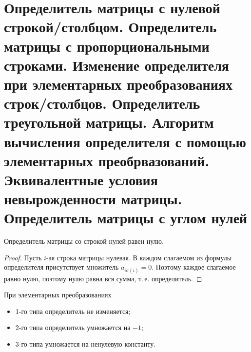 \section{Определитель матрицы с нулевой строкой/столбцом. Определитель матрицы с пропорциональными строками. Изменение определителя при элементарных преобразованиях строк/столбцов. Определитель треугольной матрицы. Алгоритм вычисления определителя с помощью элементарных преобрвазований. Эквивалентные условия невырожденности матрицы. Определитель матрицы с углом нулей}

\begin{lemma}
    Определитель матрицы со строкой нулей равен нулю.
\end{lemma}

\begin{proof}
    Пусть $i$-ая строка матрицы нулевая. В каждом слагаемом из формулы определителя присутствует множитель $a_{i\sigma(i)} = 0$. Поэтому каждое слагаемое равно нулю, поэтому нулю равна вся сумма, т.\,е. определитель.
\end{proof}

\begin{theorem}
    При элементарных преобразованиях
    \begin{itemize}[nolistsep]
        \item 1-го типа определитель не изменяется;
        \item 2-го типа определитель умножается на $-1$;
        \item 3-го типа умножается на ненулевую константу.
    \end{itemize}
\end{theorem}

